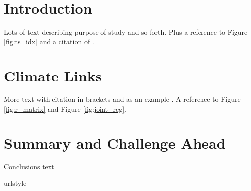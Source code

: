 \documentclass[draft,grl]{AGUTeX}
\begin{document}
\begin{article}

\section{Introduction}
Lots of text describing purpose of study and so forth.  Plus a reference
to Figure \ref{fig:ts_idx} and a citation of \cite{test1}.

\section{Climate Links}
More text with citation in brackets \cite[]{test2} and as an example 
\citep[e.g.][]{test1}. A reference
to Figure \ref{fig:r_matrix} and Figure \ref{fig:joint_reg}.
\section{Summary and Challenge Ahead}
Conclusions text


\begin{acknowledgments}

\end{acknowledgments}


\providecommand{\natexlab}[1]{#1}
\expandafter\ifx\csname urlstyle\endcsname\relax
  \providecommand{\doi}[1]{doi:\discretionary{}{}{}#1}\else
  \providecommand{\doi}{doi:\discretionary{}{}{}\begingroup
  \urlstyle{rm}\Url}\fi




\end{article}

\newpage
\end{document}
